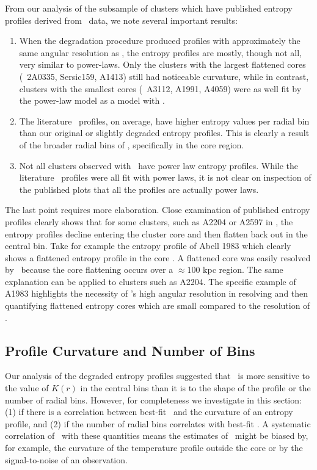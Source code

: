 \documentclass[12pt,preprint]{aastex}
\begin{document}
From our analysis of the subsample of clusters which have published
entropy profiles derived from \xmm\ data, we note several important
results:
\begin{enumerate}
\item When the degradation procedure produced profiles with
  approximately the same angular resolution as \xmm, the entropy
  profiles are mostly, though not all, very similar to
  power-laws. Only the clusters with the largest flattened cores
  (\eg\ 2A0335, Sersic159, A1413) still had noticeable curvature,
  while in contrast, clusters with the smallest cores (\eg\ A3112,
  A1991, A4059) were as well fit by the power-law model as a model
  with \kna.
\item The literature \xmm\ profiles, on average, have higher entropy
  values per radial bin than our original or slightly degraded
  entropy profiles. This is clearly a result of the broader radial
  bins of \xmm, specifically in the core region.
\item Not all clusters observed with \xmm\ have power law entropy
  profiles. While the literature \xmm\ profiles were all fit with
  power laws, it is not clear on inspection of the published plots
  that all the profiles are actually power laws.
\end{enumerate}
The last point requires more elaboration. Close examination of
published entropy profiles clearly shows that for some clusters, such
as A2204 or A2597 in \citet{pratt06}, the entropy profiles decline
entering the cluster core and then flatten back out in the central
bin. Take for example the entropy profile of Abell 1983 which clearly
shows a flattened entropy profile in the core
\citep{2003A&A...408....1P}. A flattened core was easily resolved by
\xmm\ because the core flattening occurs over a $\approx 100$ kpc
region. The same explanation can be applied to clusters such as
A2204. The specific example of A1983 highlights the necessity of
\chandra's high angular resolution in resolving and then quantifying
flattened entropy cores which are small compared to the resolution of
\xmm.


\subsection{Profile Curvature and Number of Bins}
\label{sec:curve}

Our analysis of the degraded entropy profiles suggested that \kna\ is
more sensitive to the value of $K(r)$ in the central bins than it is
to the shape of the profile or the number of radial bins. However, for
completeness we investigate in this section: (1) if there is a
correlation between best-fit \kna\ and the curvature of an entropy
profile, and (2) if the number of radial bins correlates with best-fit
\kna. A systematic correlation of \kna\ with these quantities means
the estimates of \kna\ might be biased by, for example, the curvature
of the temperature profile outside the core or by the signal-to-noise
of an observation.
\end{document}
